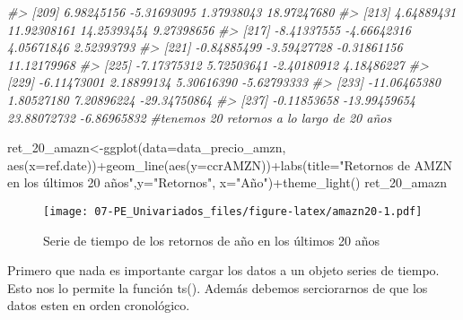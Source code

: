 \documentclass[
]{book}
\newenvironment{Shaded}{\begin{snugshade}}{\end{snugshade}}
\newcommand{\AttributeTok}[1]{\textcolor[rgb]{0.77,0.63,0.00}{#1}}
\newcommand{\CommentTok}[1]{\textcolor[rgb]{0.56,0.35,0.01}{\textit{#1}}}
\newcommand{\FunctionTok}[1]{\textcolor[rgb]{0.00,0.00,0.00}{#1}}
\newcommand{\NormalTok}[1]{#1}
\newcommand{\OtherTok}[1]{\textcolor[rgb]{0.56,0.35,0.01}{#1}}
\newcommand{\SpecialCharTok}[1]{\textcolor[rgb]{0.00,0.00,0.00}{#1}}
\newcommand{\StringTok}[1]{\textcolor[rgb]{0.31,0.60,0.02}{#1}}
\begin{document}
\begin{Shaded}
\begin{Highlighting}[]
\CommentTok{\#\textgreater{} [209]   6.98245156  {-}5.31693095   1.37938043  18.97247680}
\CommentTok{\#\textgreater{} [213]   4.64889431  11.92308161  14.25393454   9.27398656}
\CommentTok{\#\textgreater{} [217]  {-}8.41337555  {-}4.66642316   4.05671846   2.52393793}
\CommentTok{\#\textgreater{} [221]  {-}0.84885499  {-}3.59427728  {-}0.31861156  11.12179968}
\CommentTok{\#\textgreater{} [225]  {-}7.17375312   5.72503641  {-}2.40180912   4.18486227}
\CommentTok{\#\textgreater{} [229]  {-}6.11473001   2.18899134   5.30616390  {-}5.62793333}
\CommentTok{\#\textgreater{} [233] {-}11.06465380   1.80527180   7.20896224 {-}29.34750864}
\CommentTok{\#\textgreater{} [237]  {-}0.11853658 {-}13.99459654  23.88072732  {-}6.86965832}
\CommentTok{\#tenemos 20 retornos a lo largo de 20 años}
\end{Highlighting}
\end{Shaded}

\begin{Shaded}
\begin{Highlighting}[]
\NormalTok{ret\_20\_amazn}\OtherTok{\textless{}{-}}\FunctionTok{ggplot}\NormalTok{(}\AttributeTok{data=}\NormalTok{data\_precio\_amzn, }\FunctionTok{aes}\NormalTok{(}\AttributeTok{x=}\NormalTok{ref.date))}\SpecialCharTok{+}\FunctionTok{geom\_line}\NormalTok{(}\FunctionTok{aes}\NormalTok{(}\AttributeTok{y=}\NormalTok{ccrAMZN))}\SpecialCharTok{+}\FunctionTok{labs}\NormalTok{(}\AttributeTok{title=}\StringTok{"Retornos de AMZN en los últimos 20 años"}\NormalTok{,}\AttributeTok{y=}\StringTok{"Retornos"}\NormalTok{, }\AttributeTok{x=}\StringTok{"Año"}\NormalTok{)}\SpecialCharTok{+}\FunctionTok{theme\_light}\NormalTok{()}
\NormalTok{ret\_20\_amazn}
\end{Highlighting}
\end{Shaded}

\begin{figure}
\centering
\texttt{[image: 07-PE\_Univariados\_files/figure-latex/amazn20-1.pdf]}
\caption{\label{fig:amazn20}Serie de tiempo de los retornos de año en los últimos 20 años}
\end{figure}

Primero que nada es importante cargar los datos a un objeto series de
tiempo. Esto nos lo permite la función ts(). Además debemos serciorarnos
de que los datos esten en orden cronológico.
\end{document}
